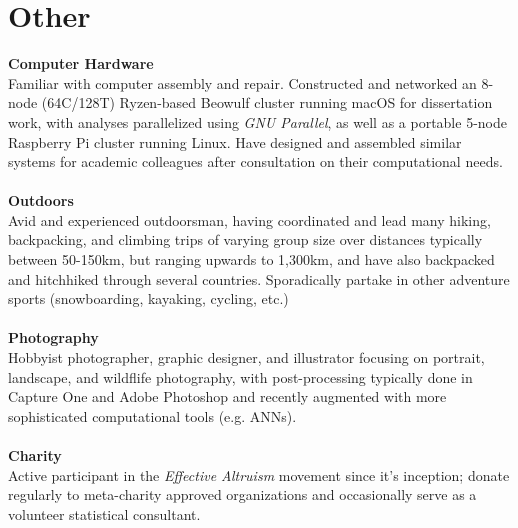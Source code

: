 \documentclass[12pt]{article}
\begin{document}
\section{Other}
\textbf{Computer Hardware}\\ Familiar with computer assembly and repair. Constructed and networked an 8-node (64C/128T) Ryzen-based Beowulf cluster running macOS for dissertation work, with analyses parallelized using \emph{GNU Parallel}, as well as a portable 5-node Raspberry Pi cluster running Linux. Have designed and assembled similar systems for academic colleagues after consultation on their computational needs.\\\\
\textbf{Outdoors}\\ Avid and experienced outdoorsman, having coordinated and lead many hiking, backpacking, and climbing trips of varying group size over distances typically between 50-150km, but ranging upwards to 1,300km, and have also backpacked and hitchhiked through several countries. Sporadically partake in other adventure sports (snowboarding, kayaking, cycling, etc.) \\\\
\textbf{Photography}\\ Hobbyist photographer, graphic designer, and illustrator focusing on portrait, landscape, and wildflife photography, with post-processing typically done in Capture One and Adobe Photoshop and recently augmented with more sophisticated computational tools (e.g. ANNs).\\\\
\textbf{Charity}\\ Active participant in the \emph{Effective Altruism} movement since it's inception; donate regularly to meta-charity approved organizations and occasionally serve as a volunteer statistical consultant.

\end{document}

